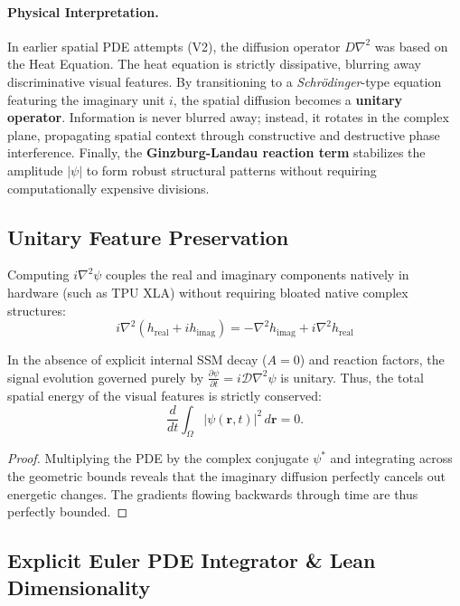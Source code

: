 \documentclass{article}
\begin{document}
\paragraph{Physical Interpretation.}
In earlier spatial PDE attempts (V2), the diffusion operator $D \nabla^2$ was based on the Heat Equation. The heat equation is strictly dissipative, blurring away discriminative visual features. By transitioning to a \textit{Schrödinger}-type equation featuring the imaginary unit $i$, the spatial diffusion becomes a \textbf{unitary operator}. Information is never blurred away; instead, it rotates in the complex plane, propagating spatial context through constructive and destructive phase interference. Finally, the \textbf{Ginzburg-Landau reaction term} stabilizes the amplitude $|\psi|$ to form robust structural patterns without requiring computationally expensive divisions.

\subsection{Unitary Feature Preservation}
\label{sec:unitary}

Computing $i \nabla^2 \psi$ couples the real and imaginary components natively in hardware (such as TPU XLA) without requiring bloated native complex structures:
\begin{equation}
    i \nabla^2 (h_{\mathrm{real}} + i h_{\mathrm{imag}}) = -\nabla^2 h_{\mathrm{imag}} + i \nabla^2 h_{\mathrm{real}}
\end{equation}

\begin{theorem}
\label{thm:unitary}
In the absence of explicit internal SSM decay ($A=0$) and reaction factors, the signal evolution governed purely by $\frac{\partial \psi}{\partial t} = i \mathcal{D} \nabla^2 \psi$ is unitary. Thus, the total spatial energy of the visual features is strictly conserved:
\[
    \frac{d}{dt} \int_{\Omega} |\psi(\mathbf{r},t)|^2 \, d\mathbf{r} = 0.
\]
\end{theorem}
\begin{proof}
Multiplying the PDE by the complex conjugate $\psi^*$ and integrating across the geometric bounds reveals that the imaginary diffusion perfectly cancels out energetic changes. The gradients flowing backwards through time are thus perfectly bounded.
\end{proof}

\subsection{Explicit Euler PDE Integrator \& Lean Dimensionality}
\label{sec:euler}
\end{document}
